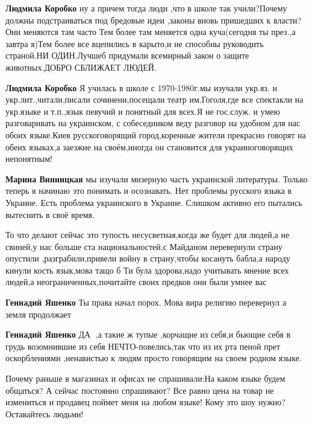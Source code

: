 \begin{itemize}
{\begin{itemize}
\textbf{Людмила Коробко} ну а причем тогда люди ,что в школе так учили?Почему должны подстраиваться под бредовые идеи ,законы вновь пришедших к власти?Они меняются там часто
Тем более там меняется одна куча(сегодня ты през.,а завтра я)Тем более все вцепились в карыто,и не способны руководить страной.НИ ОДИН.Лучшеб придумали всемирный закон о защите животных.ДОБРО СБЛИЖАЕТ ЛЮДЕЙ.

\textbf{Людмила Коробко} Я училась в школе с 1970-1980г.мы изучали укр.яз. и укр.лит.,читали,писали сочинени,посещали театр им.Гоголя,где все спектакли на укр.языке и т.п.,язык певучий и понятный для всех.Я не гос.служ. и умею разговаривать на украинском, с собеседником веду разговор на удобном для нас обоих языке.Киев русскоговорящий город,коренные жители прекрасно говорят на обеих языках,а заезжие на своём,иногда он становится для украиноговорящих непонятным!

\textbf{Марина Винницкая} мы изучали мизерную часть украинской литературы. Только теперь я начинаю это понимать и осознавать.
Нет проблемы русского языка в Украине. Есть проблема украинского в Украине. Слишком активно его пытались вытеснить в своё время.
\end{itemize}


То что делают сейчас это тупость несусветная,когда же будет для людей,а не
свиней,у нас больше ста национальностей,с Майданом перевернули страну опустили
,разграбили,привели войну в страну,чтобы косануть бабла,а народу кинули кость
язык,мова тащо б Ти була здорова,надо учитывать мнение всех людей,а
неограниченных,почитайте своих предков они были умнее вас

\begin{itemize}

\textbf{Геннадий Яшенко} Ты права начал порох. Мова вира религию перевернул а земля продолжает

\textbf{Геннадий Яшенко} ДА 💯,а такие ж тупые ,корчащие из себя,и бьющие себя
в грудь возомнившие из себя НЕЧТО-повелись,так что из их рта пеной прет
оскорблениями ,ненавистью к людям просто говорящим на своем родном языке.
\end{itemize}


Почему раньше в магазинах и офисах не спрашивали:На каком языке будем общаться?
А сейчас постоянно спрашивают? Все равно цена на товар не измениться и продавец
поймет меня на любом языке! Кому это шоу нужно? Оставайтесь людьми!

}
\end{itemize}

